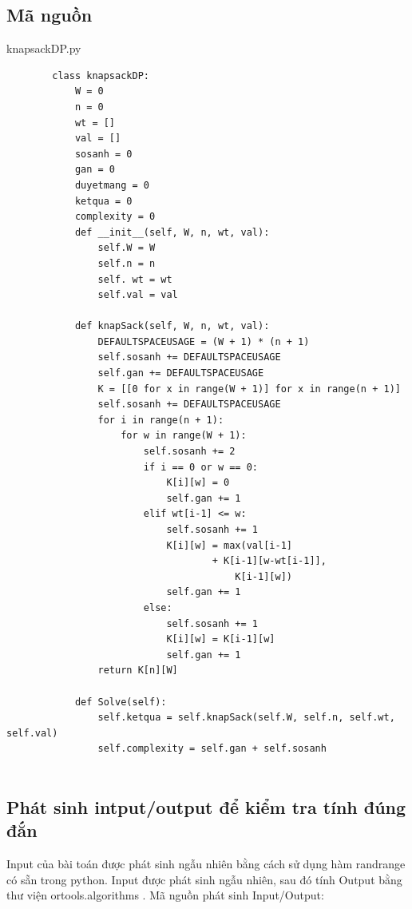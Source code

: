 \documentclass[12pt,a4paper]{report}
\begin{document}
    \subsection{Mã nguồn}
    knapsackDP.py
    \begin{lstlisting}
        class knapsackDP:
            W = 0
            n = 0
            wt = []
            val = []
            sosanh = 0
            gan = 0
            duyetmang = 0
            ketqua = 0
            complexity = 0
            def __init__(self, W, n, wt, val):
                self.W = W
                self.n = n
                self. wt = wt
                self.val = val
        
            def knapSack(self, W, n, wt, val): 
                DEFAULTSPACEUSAGE = (W + 1) * (n + 1)
                self.sosanh += DEFAULTSPACEUSAGE
                self.gan += DEFAULTSPACEUSAGE
                K = [[0 for x in range(W + 1)] for x in range(n + 1)] 
                self.sosanh += DEFAULTSPACEUSAGE
                for i in range(n + 1):
                    for w in range(W + 1):
                        self.sosanh += 2 
                        if i == 0 or w == 0: 
                            K[i][w] = 0
                            self.gan += 1
                        elif wt[i-1] <= w: 
                            self.sosanh += 1
                            K[i][w] = max(val[i-1] 
                                    + K[i-1][w-wt[i-1]],   
                                        K[i-1][w])
                            self.gan += 1 
                        else: 
                            self.sosanh += 1
                            K[i][w] = K[i-1][w] 
                            self.gan += 1
                return K[n][W] 
            
            def Solve(self):
                self.ketqua = self.knapSack(self.W, self.n, self.wt, self.val)
                self.complexity = self.gan + self.sosanh
        
    \end{lstlisting}
    \subsection{Phát sinh intput/output để kiểm tra tính đúng đắn}
    Input của bài toán được phát sinh ngẫu nhiên bằng cách sử dụng hàm randrange có
    sẵn trong python. Input được phát sinh ngẫu nhiên, sau đó tính Output bằng 
    thư viện ortools.algorithms . Mã nguồn phát sinh Input/Output:
\end{document}
